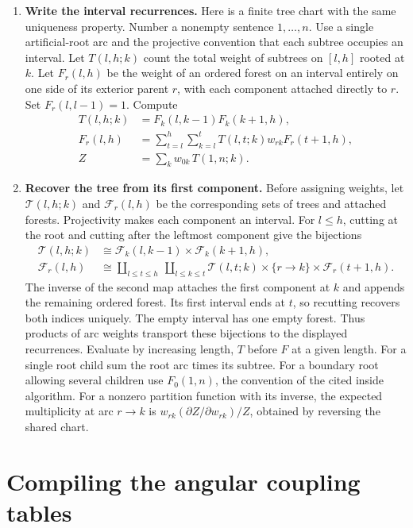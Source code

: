 \documentclass[11pt,a4paper]{article}
\theoremstyle{definition}
\theoremstyle{remark}\newaliascnt{remark}{theorem}
\numberwithin{equation}{section}
\begin{document}
\begin{enumerate}[titledsteps]
    \item \textbf{Write the interval recurrences.} Here is a finite tree chart with the same uniqueness property. Number a nonempty sentence $1,\ldots,n$. Use a single artificial-root arc and the projective convention that each subtree occupies an interval. Let $T(l,h;k)$ count the total weight of subtrees on $[l,h]$ rooted at $k$. Let $F_r(l,h)$ be the weight of an ordered forest on an interval entirely on one side of its exterior parent $r$, with each component attached directly to $r$. Set $F_r(l,l-1)=1$. Compute
\begin{align*}
 T(l,h;k)&=F_k(l,k-1)F_k(k+1,h),\\
 F_r(l,h)&=\sum_{t=l}^h\sum_{k=l}^t T(l,t;k)w_{r k}F_r(t+1,h),\\
 Z&=\sum_k w_{0k}\,T(1,n;k).
\end{align*}

    \item \textbf{Recover the tree from its first component.} Before assigning weights, let \(\mathcal T(l,h;k)\) and \(\mathcal F_r(l,h)\) be the corresponding sets of trees and attached forests. Projectivity makes each component an interval. For \(l\le h\), cutting at the root and cutting after the leftmost component give the bijections
\[
\begin{aligned}
 \mathcal T(l,h;k)&\cong\mathcal F_k(l,k-1)\times\mathcal F_k(k+1,h),\\
 \mathcal F_r(l,h)&\cong
 \coprod_{l\le t\le h}\ \coprod_{l\le k\le t}
   \mathcal T(l,t;k)\times\{r\to k\}\times\mathcal F_r(t+1,h).
\end{aligned}
\]
The inverse of the second map attaches the first component at \(k\) and appends the remaining ordered forest. Its first interval ends at \(t\), so recutting recovers both indices uniquely. The empty interval has one empty forest. Thus products of arc weights transport these bijections to the displayed recurrences. Evaluate by increasing length, \(T\) before \(F\) at a given length. For a single root child sum the root arc times its subtree. For a boundary root allowing several children use \(F_0(1,n)\), the convention of the cited inside algorithm. For a nonzero partition function with its inverse, the expected multiplicity at arc \(r\to k\) is \(w_{rk}(\partial Z/\partial w_{rk})/Z\), obtained by reversing the shared chart.
\end{enumerate}

\section{Compiling the angular coupling tables}\label{app:angular}
\end{document}
